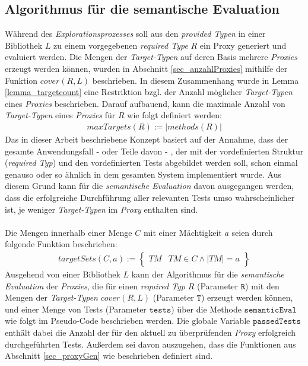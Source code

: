 \subsection{Algorithmus für die semantische Evaluation}\label{sec_semEvalAlgo}
Während des \emph{Explorationsprozesses} soll aus den \emph{provided Typen} in einer Bibliothek $L$ zu einem vorgegebenen \emph{required Type} $R$ ein Proxy generiert und evaluiert werden. Die Mengen der \emph{Target-Typen} auf deren Basis mehrere \emph{Proxies} erzeugt werden können, wurden in Abschnitt \ref{sec_anzahlProxies} mithilfe der Funktion $\mathit{cover(R,L)}$ beschrieben. In diesem Zusammenhang wurde in Lemma \ref{lemma_targetcount} eine Restriktion bzgl. der Anzahl möglicher \emph{Target-Typen} eines \emph{Proxies} beschrieben.
Darauf aufbauend, kann die maximale Anzahl von \emph{Target-Typen} eines \emph{Proxies} für $R$ wie folgt definiert werden:
\begin{gather*}
\mathit{maxTargets(R)} := |\mathit{methods(R)}|
\end{gather*}
\noindent
Das in dieser Arbeit beschriebene Konzept basiert auf der Annahme, dass der gesamte Anwendungsfall - oder Teile davon - , der mit der vordefinierten Struktur (\emph{required Typ}) und den vordefinierten Tests abgebildet werden soll, schon einmal genauso oder so ähnlich in dem gesamten System implementiert wurde. Aus diesem Grund kann für die \emph{semantische Evaluation} davon ausgegangen werden, dass die erfolgreiche Durchführung aller relevanten Tests umso wahrscheinlicher ist, je weniger \emph{Target-Typen} im \emph{Proxy} enthalten sind.
\\\\
Die Mengen innerhalb einer Menge $\mathit{C}$ mit einer Mächtigkeit $a$ seien durch folgende Funktion beschrieben:
\begin{gather*}
\mathit{targetSets(\mathit{C},a)} := 
\left\{\begin{array}{l|l}	
				\mathit{TM} & \mathit{TM} \in \mathit{C} \wedge |\mathit{TM}| = a
		 \end{array}
\right\}
\end{gather*}
\noindent
Ausgehend von einer Bibliothek $L$ kann der Algorithmus für die \emph{semantische Evaluation} der \emph{Proxies}, die für einen \emph{required Typ} $R$ (Parameter $\texttt{R}$) mit den Mengen der \emph{Target-Typen} $\mathit{cover(R, L)}$ (Parameter $\texttt{T}$) erzeugt werden können, und einer Menge von Tests (Parameter $\texttt{tests}$) über die Methode $\texttt{semanticEval}$ wie folgt im Pseudo-Code beschrieben werden. Die globale Variable $\texttt{passedTests}$ enthält dabei die Anzahl der für den aktuell zu überprüfenden \emph{Proxy} erfolgreich durchgeführten Tests. Außerdem sei davon auszugehen, dass die Funktionen aus Abschnitt \ref{sec_proxyGen} wie beschrieben definiert sind.
